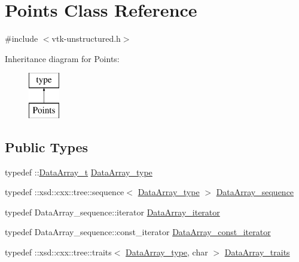 \hypertarget{classPoints}{}\section{Points Class Reference}
\label{classPoints}


{\ttfamily \#include $<$vtk-\/unstructured.\+h$>$}

Inheritance diagram for Points\+:\begin{figure}[H]
\begin{center}
\leavevmode
\includegraphics[height=2.000000cm]{classPoints}
\end{center}
\end{figure}
\subsection*{Public Types}
\begin{DoxyCompactItemize}
\item 
typedef \+::\hyperlink{classDataArray__t}{Data\+Array\+\_\+t} \hyperlink{classPoints_a6afedf501b722fe7d7ffeae03ece6238}{Data\+Array\+\_\+type}
\item 
typedef \+::xsd\+::cxx\+::tree\+::sequence$<$ \hyperlink{classPoints_a6afedf501b722fe7d7ffeae03ece6238}{Data\+Array\+\_\+type} $>$ \hyperlink{classPoints_ac8b51dcf0e7659ca61ff9b9d24051016}{Data\+Array\+\_\+sequence}
\item 
typedef Data\+Array\+\_\+sequence\+::iterator \hyperlink{classPoints_ac4cd7a177b464c1e08d493600a7e6e16}{Data\+Array\+\_\+iterator}
\item 
typedef Data\+Array\+\_\+sequence\+::const\+\_\+iterator \hyperlink{classPoints_a795a395909c3360569fe0e854ba6059e}{Data\+Array\+\_\+const\+\_\+iterator}
\item 
typedef \+::xsd\+::cxx\+::tree\+::traits$<$ \hyperlink{classPoints_a6afedf501b722fe7d7ffeae03ece6238}{Data\+Array\+\_\+type}, char $>$ \hyperlink{classPoints_a815b88c9204c7251f4a08c6769645ef1}{Data\+Array\+\_\+traits}
\end{DoxyCompactItemize}
